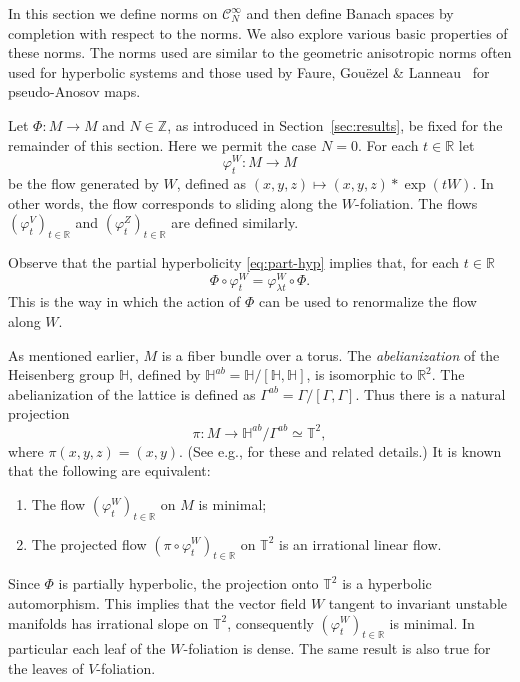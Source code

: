 \documentclass[a4paper,11pt]{amsart}
\theoremstyle{remark}
\newcommand{\cC}{\mathcal{C}} %
\newcommand{\bR}{\mathbb{R}} %
\newcommand{\bT}{\mathbb{T}} %
\newcommand{\bZ}{\mathbb{Z}} %
\newcommand{\bH}{\mathbb{H}} %
\newcommand{\dv}{V} %
\newcommand{\dw}{W} %
\newcommand{\dz}{Z} %
\begin{document}
In this section we define norms on \(\cC_N^\infty\) and then define Banach spaces by completion with respect to the norms.
We also explore various basic properties of these norms.
The norms used are similar to the geometric anisotropic norms often used for hyperbolic systems \cite{GL19,GL06,GL08} and those used by Faure, Gouëzel \& Lanneau~\cite{FGL19} for pseudo-Anosov maps.

Let \(\Phi:M \to M\) and \(N\in \bZ\), as introduced in Section~\ref{sec:results}, be fixed for the remainder of this section.
Here we permit the case \(N=0\).
For each \(t\in \bR\) let
\[
    \varphi_{t}^{\dw} : M \to M
\]
be the flow generated by $\dw$, defined as \((x,y,z) \mapsto (x,y,z) * \exp(t\dw)\). 
In other words, the flow corresponds to sliding along the \(\dw\)-foliation. 
The flows \((\varphi_{t}^{\dv})_{t\in\bR}\) and \((\varphi_{t}^{\dz})_{t\in\bR}\) are defined similarly. 

Observe that the partial hyperbolicity \eqref{eq:part-hyp} implies that, for each \(t\in \bR\)  
\begin{equation}
    \label{eq:renorm}
    \Phi\circ\varphi_{t}^{\dw}  =  \varphi_{\lambda t}^{\dw}\circ \Phi.
\end{equation}
This is the way in which the action of \(\Phi\) can be used to renormalize the flow along \(\dw\).

As mentioned earlier, \(M\) is a fiber bundle over a torus. 
The \emph{abelianization} of the Heisenberg group $\bH$, defined by $\bH^{ab} = \bH / [\bH,\bH]$, is isomorphic to $\bR^2$.
The abelianization of the lattice is defined as $\Gamma^{ab} = \Gamma / [\Gamma,\Gamma].$ 
Thus there is a natural projection 
\begin{equation}
    \label{eq:project}
    \pi: M \rightarrow  \bH^{ab}/\Gamma^{ab} \simeq \mathbb{T}^2,
\end{equation}
where $\pi(x,y,z) = (x,y)$. (See e.g., \cite{AGH63} for these and related details.)
It is known that the following are equivalent:
\begin{enumerate}
    \item The flow $(\varphi_t^\dw)_{t\in\bR}$ on $M$ is minimal;
    \item The projected flow $(\pi \circ \varphi_t^\dw)_{t\in\bR}$ on $\bT^{2}$ is an irrational linear flow.
\end{enumerate}
Since \(\Phi\) is partially hyperbolic, the projection onto $\bT^{2}$ is a hyperbolic automorphism.
This implies that the vector field \(\dw\) tangent to invariant unstable manifolds has irrational slope on $\bT^{2}$,  consequently $(\varphi_t^\dw)_{t\in\bR}$ is minimal.
In particular each leaf of the \(\dw\)-foliation is dense. 
The same result is also true for the leaves of \(\dv\)-foliation.
\end{document}
